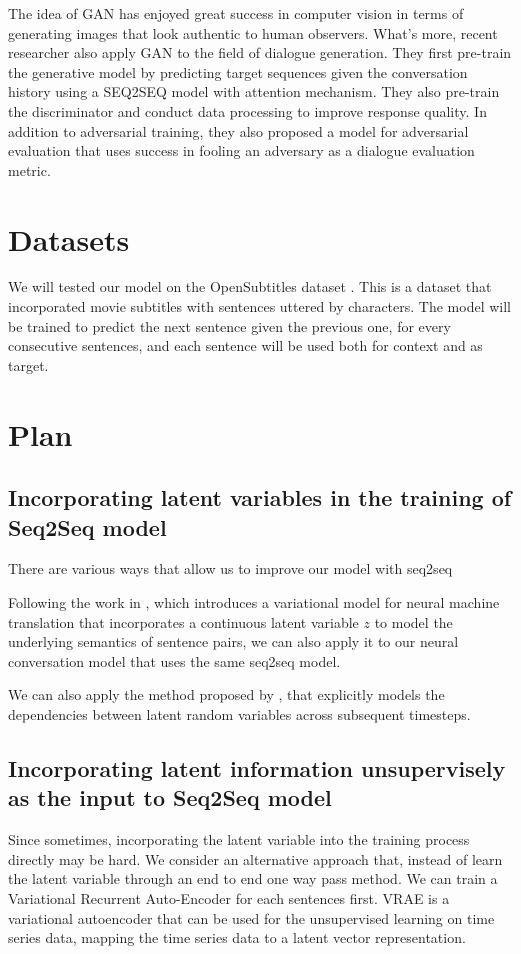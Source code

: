 \documentclass{article}
\begin{document}
The idea of GAN has enjoyed great success in computer vision in terms of generating images that look authentic to human observers. What's more, recent researcher also apply GAN to the field of dialogue generation. They first pre-train the generative model by predicting target sequences given the conversation history using a SEQ2SEQ model with attention mechanism. They also pre-train the discriminator and conduct data processing to improve response quality. In addition to adversarial training, they also proposed a model for adversarial evaluation that uses success in fooling an adversary as a dialogue evaluation metric.

\section{Datasets}

We will tested our model on the OpenSubtitles
dataset \cite{opensubtitle}. This is a dataset that incorporated movie subtitles with sentences uttered by characters.
The model will be trained to predict the next sentence given the previous one, for every consecutive sentences, and each sentence will be used both for context and as target.

 

\section{Plan}

\subsection{Incorporating latent variables in the training of Seq2Seq model}
There are various ways that allow us to improve our model with seq2seq 

Following the work in \cite{vnmt}, which introduces a variational model for neural machine translation that incorporates a continuous latent variable $z$ to model the underlying semantics of sentence pairs, we can also apply it to our neural conversation model that uses the same seq2seq model. 

We can also apply the method proposed by \cite{vrnn}, that explicitly models the dependencies between latent random variables across subsequent timesteps.

\subsection{Incorporating latent information unsupervisely as the input to Seq2Seq model}
Since sometimes, incorporating the latent variable into the training process directly may be hard. We consider an alternative approach that, instead of learn the latent variable through an end to end one way pass method. We can train a Variational Recurrent Auto-Encoder \cite{vrae} for each sentences first. VRAE is a variational autoencoder that can be used for the unsupervised learning on time series data, mapping the time series data to a latent vector representation. 
\end{document}
